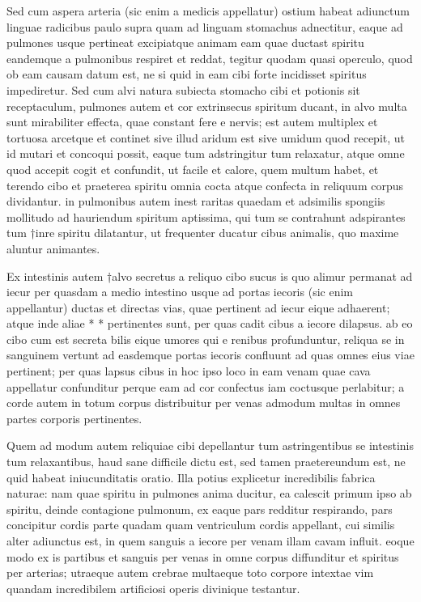  Sed cum aspera arteria (sic enim a medicis appellatur) ostium habeat adiunctum linguae radicibus paulo supra quam ad linguam stomachus adnectitur, eaque ad pulmones usque pertineat excipiatque animam eam quae ductast spiritu eandemque a pulmonibus respiret et reddat, tegitur quodam quasi operculo, quod ob eam causam datum est, ne si quid in eam cibi forte incidisset spiritus impediretur. Sed cum alvi natura subiecta stomacho cibi et potionis sit receptaculum, pulmones autem et cor extrinsecus spiritum ducant, in alvo multa sunt mirabiliter effecta, quae constant fere e nervis; est autem multiplex et tortuosa arcetque et continet sive illud aridum est sive umidum quod recepit, ut id mutari et concoqui possit, eaque tum adstringitur tum relaxatur, atque omne quod accepit cogit et confundit, ut facile et calore, quem multum habet, et terendo cibo et praeterea spiritu omnia cocta atque confecta in reliquum corpus dividantur. in pulmonibus autem inest raritas quaedam et adsimilis spongiis mollitudo ad hauriendum spiritum aptissima, qui tum se contrahunt adspirantes tum †inre spiritu dilatantur, ut frequenter ducatur cibus animalis, quo maxime aluntur animantes.

 Ex intestinis autem †alvo secretus a reliquo cibo sucus is quo alimur permanat ad iecur per quasdam a medio intestino usque ad portas iecoris (sic enim appellantur) ductas et directas vias, quae pertinent ad iecur eique adhaerent; atque inde aliae * * pertinentes sunt, per quas cadit cibus a iecore dilapsus. ab eo cibo cum est secreta bilis eique umores qui e renibus profunduntur, reliqua se in sanguinem vertunt ad easdemque portas iecoris confluunt ad quas omnes eius viae pertinent; per quas lapsus cibus in hoc ipso loco in eam venam quae cava appellatur confunditur perque eam ad cor confectus iam coctusque perlabitur; a corde autem in totum corpus distribuitur per venas admodum multas in omnes partes corporis pertinentes.

 Quem ad modum autem reliquiae cibi depellantur tum astringentibus se intestinis tum relaxantibus, haud sane difficile dictu est, sed tamen praetereundum est, ne quid habeat iniucunditatis oratio. Illa potius explicetur incredibilis fabrica naturae: nam quae spiritu in pulmones anima ducitur, ea calescit primum ipso ab spiritu, deinde contagione pulmonum, ex eaque pars redditur respirando, pars concipitur cordis parte quadam quam ventriculum cordis appellant, cui similis alter adiunctus est, in quem sanguis a iecore per venam illam cavam influit. eoque modo ex is partibus et sanguis per venas in omne corpus diffunditur et spiritus per arterias; utraeque autem crebrae multaeque toto corpore intextae vim quandam incredibilem artificiosi operis divinique testantur.

